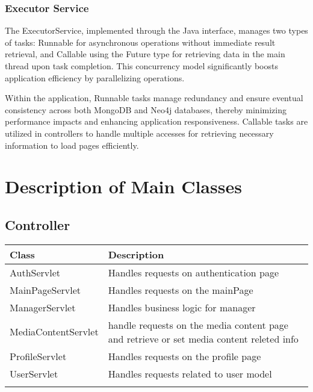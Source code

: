 \subsubsection*{Executor Service}

The ExecutorService, implemented through the Java interface, manages two types of tasks: Runnable for asynchronous operations 
without immediate result retrieval, and Callable using the Future type for retrieving data in the main thread upon task completion. 
This concurrency model significantly boosts application efficiency by parallelizing operations.

\vspace{\baselineskip}

Within the application, Runnable tasks manage redundancy and ensure eventual consistency across both MongoDB and 
Neo4j databases, thereby minimizing performance impacts and enhancing application responsiveness. Callable tasks 
are utilized in controllers to handle multiple accesses for retrieving necessary information to load pages efficiently.

\newpage

\section{Description of Main Classes}

\subsection*{Controller}
\renewcommand{\arraystretch}{1.5}
\begin{longtable}{|>{\arraybackslash}p{0.3\linewidth}|>{\arraybackslash}p{0.73\linewidth}|}
    \cline{1-2}
    \textbf{Class} & \textbf{Description} \\
    \cline{1-2}
    AuthServlet & Handles requests on authentication page \\
    \cline{1-2}
    MainPageServlet & Handles requests on the mainPage \\
    \cline{1-2}
    ManagerServlet & Handles business logic for manager \\    
    \cline{1-2}
    MediaContentServlet & handle requests on the media content page and retrieve or set media content releted info \\
    \cline{1-2}
    ProfileServlet & Handles requests on the profile page \\
    \cline{1-2}
    UserServlet & Handles requests related to user model \\
    \cline{1-2}
\end{longtable}

